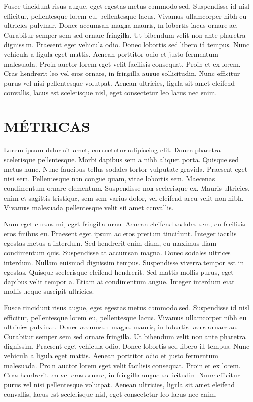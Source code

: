 Fusce tincidunt risus augue, eget egestas metus commodo sed. Suspendisse id nisl efficitur, pellentesque lorem eu, pellentesque lacus. Vivamus ullamcorper nibh eu ultricies pulvinar. Donec accumsan magna mauris, in lobortis lacus ornare ac. Curabitur semper sem sed ornare fringilla. Ut bibendum velit non ante pharetra dignissim. Praesent eget vehicula odio. Donec lobortis sed libero id tempus. Nunc vehicula a ligula eget mattis. Aenean porttitor odio et justo fermentum malesuada. Proin auctor lorem eget velit facilisis consequat. Proin et ex lorem. Cras hendrerit leo vel eros ornare, in fringilla augue sollicitudin. Nunc efficitur purus vel nisi pellentesque volutpat. Aenean ultricies, ligula sit amet eleifend convallis, lacus est scelerisque nisl, eget consectetur leo lacus nec enim.

\section{MÉTRICAS}

Lorem ipsum dolor sit amet, consectetur adipiscing elit. Donec pharetra scelerisque pellentesque. Morbi dapibus sem a nibh aliquet porta. Quisque sed metus nunc. Nunc faucibus tellus sodales tortor vulputate gravida. Praesent eget nisi sem. Pellentesque non congue quam, vitae lobortis sem. Maecenas condimentum ornare elementum. Suspendisse non scelerisque ex. Mauris ultricies, enim et sagittis tristique, sem sem varius dolor, vel eleifend arcu velit non nibh. Vivamus malesuada pellentesque velit sit amet convallis.

Nam eget cursus mi, eget fringilla urna. Aenean eleifend sodales sem, eu facilisis eros finibus eu. Praesent eget ipsum ac eros pretium tincidunt. Integer iaculis egestas metus a interdum. Sed hendrerit enim diam, eu maximus diam condimentum quis. Suspendisse at accumsan magna. Donec sodales ultrices interdum. Nullam euismod dignissim tempus. Suspendisse viverra tempor est in egestas. Quisque scelerisque eleifend hendrerit. Sed mattis mollis purus, eget dapibus velit tempor a. Etiam at condimentum augue. Integer interdum erat mollis neque suscipit ultricies.

Fusce tincidunt risus augue, eget egestas metus commodo sed. Suspendisse id nisl efficitur, pellentesque lorem eu, pellentesque lacus. Vivamus ullamcorper nibh eu ultricies pulvinar. Donec accumsan magna mauris, in lobortis lacus ornare ac. Curabitur semper sem sed ornare fringilla. Ut bibendum velit non ante pharetra dignissim. Praesent eget vehicula odio. Donec lobortis sed libero id tempus. Nunc vehicula a ligula eget mattis. Aenean porttitor odio et justo fermentum malesuada. Proin auctor lorem eget velit facilisis consequat. Proin et ex lorem. Cras hendrerit leo vel eros ornare, in fringilla augue sollicitudin. Nunc efficitur purus vel nisi pellentesque volutpat. Aenean ultricies, ligula sit amet eleifend convallis, lacus est scelerisque nisl, eget consectetur leo lacus nec enim.

